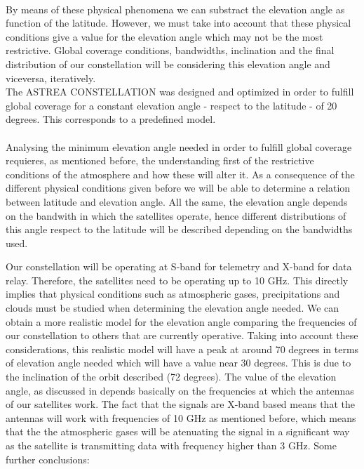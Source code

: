 \paragraph{}

By means of these physical phenomena we can substract the elevation angle as function of the latitude. However, we must take into account that these physical conditions give a value for the elevation angle which may not be the most restrictive. Global coverage conditions, bandwidths, inclination and the final distribution of our constellation will be considering this elevation angle and viceversa, iteratively. \\

The ASTREA CONSTELLATION was designed and optimized in order to fulfill global coverage for a constant elevation angle - respect to the latitude - of 20 degrees. This corresponds to a predefined model. \\

\paragraph{}

Analysing the minimum elevation angle needed in order to fulfill global coverage requieres, as mentioned before, the understanding first of the restrictive conditions of the atmosphere and how these will alter it. As a consequence of the different physical conditions given before we will be able to determine a relation between latitude and elevation angle. All the same, the elevation angle depends on the bandwith in which the satellites operate, hence different distributions of this angle respect to the latitude will be described depending on the bandwidths used. 

Our constellation will be operating at S-band for telemetry and X-band for data relay. Therefore, the satellites need to be operating up to 10 GHz. This directly implies that physical conditions such as atmospheric gases, precipitations and clouds must be studied when determining the elevation angle needed. We can obtain a more realistic model for the elevation angle comparing the frequencies of our constellation to others that are currently operative. Taking into account these considerations, this realistic model will have a peak at around 70 degrees in terms of elevation angle needed which will have a value near 30 degrees. This is due to the inclination of the orbit described (72 degrees). The value of the elevation angle, as discussed in \cite{Li2016} depends basically on the frequencies at which the antennas of our satellites work. The fact that the signals are X-band based means that the antennas will work with frequencies of 10 GHz as mentioned before, which means that the the atmospheric gases will be atenuating the signal in a significant way as the satellite is transmitting data with frequency higher than 3 GHz. Some further conclusions:\\

